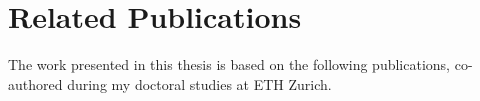 
\section{Related Publications}
\label{sec:intro_papers}

The work presented in this thesis is based on the following publications, co-authored during my doctoral studies at ETH Zurich.

